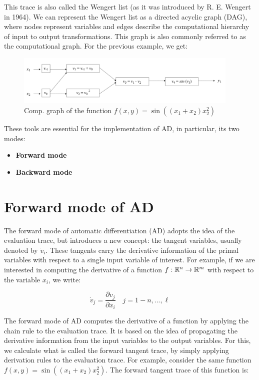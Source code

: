 This trace is also called the Wengert list (as it was introduced by R. E. Wengert in 1964). We can represent
the Wengert list as a directed acyclic graph (DAG), where nodes represent variables and edges
describe the computational hierarchy of input to output transformations. This graph is also commonly
referred to as the computational graph. For the previous example, we get:

\begin{figure}[H]
    \centering
    \includegraphics[width=0.95\textwidth]{figures/DAG_autodiff.png}
    \caption{Comp. graph of the function $f(x, y) = \sin((x_1 + x_2) x_2^2)$}
    \label{fig:DAG_autodiff}
\end{figure}

These tools are essential for the implementation of AD, in particular, its two modes:

\begin{itemize}
    \item \textbf{Forward mode}
    \item \textbf{Backward mode}
\end{itemize}

\section{Forward mode of AD}

The forward mode of automatic differentiation (AD) adopts the idea of the evaluation trace,
but introduces a new concept: the tangent variables, usually denoted by $\dot{v}_i$. These
tangents carry the derivative information of the primal variables with respect to a single
input variable of interest. For example, if we are interested in computing the derivative
of a function $f: \mathbb{R}^n \to \mathbb{R}^m$ with respect to the variable $x_i$, we write:

$$\dot{v}_j = \frac{\partial v_j}{\partial x_i} \quad j = 1-n, ..., \ell$$

The forward mode of AD computes the derivative of a function by applying the chain rule
to the evaluation trace. It is based on the idea of propagating the derivative information
from the input variables to the output variables. For this, we calculate what is called
the forward tangent trace, by simply applying derivation rules to the evaluation trace.
For example, consider the same function $f(x, y) = \sin((x_1 + x_2) x_2^2)$.
The forward tangent trace of this function is:

